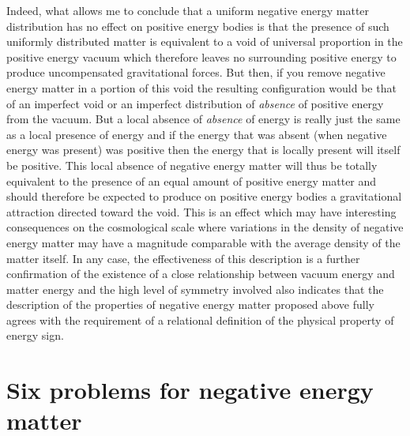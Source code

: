 \documentclass[notitlepage,12pt]{report}
\begin{document}
Indeed, what allows me to conclude that a uniform negative energy matter distribution has no effect on positive energy bodies is that the presence of such uniformly distributed matter is equivalent to a void of universal proportion in the positive energy vacuum which therefore leaves no surrounding positive energy to produce uncompensated gravitational forces. But then, if you remove negative energy matter in a portion of this void the resulting configuration would be that of an imperfect void or an imperfect distribution of \textit{absence} of positive energy from the vacuum. But a local absence of \textit{absence} of energy is really just the same as a local presence of energy and if the energy that was absent (when negative energy was present) was positive then the energy that is locally present will itself be positive. This local absence of negative energy matter will thus be totally equivalent to the presence of an equal amount of positive energy matter and should therefore be expected to produce on positive energy bodies a gravitational attraction directed toward the void. This is an effect which may have interesting consequences on the cosmological scale where variations in the density of negative energy matter may have a magnitude comparable with the average density of the matter itself. In any case, the effectiveness of this description is a further confirmation of the existence of a close relationship between vacuum energy and matter energy and the high level of symmetry involved also indicates that the description of the properties of negative energy matter proposed above fully agrees with the requirement of a relational definition of the physical property of energy sign.

\section{Six problems for negative energy matter}
\end{document}
